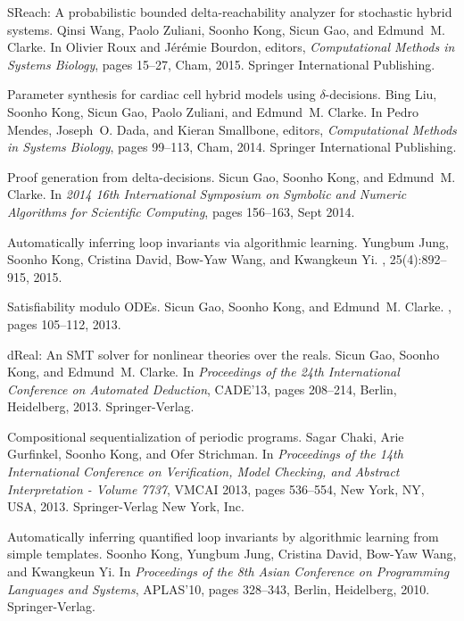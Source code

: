 \documentclass[10pt, letterpaper]{article}
\begin{document}
\begin{thebibliography}{10}
  {SReach}: A probabilistic bounded delta-reachability analyzer for
  stochastic hybrid systems.
  \newblock Qinsi Wang, Paolo Zuliani, Soonho Kong, Sicun Gao, and Edmund~M. Clarke.
  \newblock In Olivier Roux and J{\'e}r{\'e}mie Bourdon, editors, {\em
  Computational Methods in Systems Biology}, pages 15--27, Cham, 2015. Springer
  International Publishing.

  Parameter synthesis for cardiac cell hybrid models using
  $\delta$-decisions.
  \newblock Bing Liu, Soonho Kong, Sicun Gao, Paolo Zuliani, and Edmund~M. Clarke.
  \newblock In Pedro Mendes, Joseph~O. Dada, and Kieran Smallbone, editors, {\em
  Computational Methods in Systems Biology}, pages 99--113, Cham, 2014.
  Springer International Publishing.

  Proof generation from delta-decisions.
  \newblock Sicun Gao, Soonho Kong, and Edmund~M. Clarke.
  \newblock In {\em 2014 16th International Symposium on Symbolic and Numeric
  Algorithms for Scientific Computing}, pages 156--163, Sept 2014.

  Automatically inferring loop invariants via algorithmic learning.
  \newblock Yungbum Jung, Soonho Kong, Cristina David, Bow-Yaw Wang, and Kwangkeun Yi.
  , 25(4):892–915,
  2015.

  Satisfiability modulo {ODEs}.
  \newblock Sicun Gao, Soonho Kong, and Edmund~M. Clarke.
  , pages 105--112,
  2013.

  {dReal}: An {SMT} solver for nonlinear theories over the reals.
  \newblock Sicun Gao, Soonho Kong, and Edmund~M. Clarke.
  \newblock In {\em Proceedings of the 24th International Conference on Automated
  Deduction}, CADE'13, pages 208--214, Berlin, Heidelberg, 2013.
  Springer-Verlag.

  Compositional sequentialization of periodic programs.
  \newblock Sagar Chaki, Arie Gurfinkel, Soonho Kong, and Ofer Strichman.
  \newblock In {\em Proceedings of the 14th International Conference on
  Verification, Model Checking, and Abstract Interpretation - Volume 7737},
  VMCAI 2013, pages 536--554, New York, NY, USA, 2013. Springer-Verlag New
  York, Inc.

  Automatically inferring quantified loop invariants by algorithmic
  learning from simple templates.
  \newblock Soonho Kong, Yungbum Jung, Cristina David, Bow-Yaw Wang, and Kwangkeun Yi.
  \newblock In {\em Proceedings of the 8th Asian Conference on Programming
  Languages and Systems}, APLAS'10, pages 328--343, Berlin, Heidelberg, 2010.
  Springer-Verlag.


\end{thebibliography}
\end{document}
